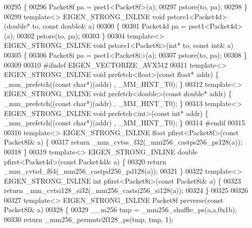 \begin{DoxyCode}
{{00295 \{
00296   Packet8f pa = pset1<Packet8f>(a);
00297   pstore(to, pa);
00298 \}
00299 \textcolor{keyword}{template}<> EIGEN\_STRONG\_INLINE \textcolor{keywordtype}{void} pstore1<Packet4d>(\textcolor{keywordtype}{double}* to, \textcolor{keyword}{const} \textcolor{keywordtype}{double}& a)
00300 \{
00301   Packet4d pa = pset1<Packet4d>(a);
00302   pstore(to, pa);
00303 \}
00304 \textcolor{keyword}{template}<> EIGEN\_STRONG\_INLINE \textcolor{keywordtype}{void} pstore1<Packet8i>(\textcolor{keywordtype}{int}* to, \textcolor{keyword}{const} \textcolor{keywordtype}{int}& a)
00305 \{
00306   Packet8i pa = pset1<Packet8i>(a);
00307   pstore(to, pa);
00308 \}
00309 
00310 \textcolor{preprocessor}{#ifndef EIGEN\_VECTORIZE\_AVX512}
00311 \textcolor{keyword}{template}<> EIGEN\_STRONG\_INLINE \textcolor{keywordtype}{void} prefetch<float>(\textcolor{keyword}{const} \textcolor{keywordtype}{float}*   addr) \{ \_mm\_prefetch((\textcolor{keyword}{const} \textcolor{keywordtype}{char}*)(addr)
      , \_MM\_HINT\_T0); \}
00312 \textcolor{keyword}{template}<> EIGEN\_STRONG\_INLINE \textcolor{keywordtype}{void} prefetch<double>(\textcolor{keyword}{const} \textcolor{keywordtype}{double}* addr) \{ \_mm\_prefetch((\textcolor{keyword}{const} \textcolor{keywordtype}{char}*)(addr)
      , \_MM\_HINT\_T0); \}
00313 \textcolor{keyword}{template}<> EIGEN\_STRONG\_INLINE \textcolor{keywordtype}{void} prefetch<int>(\textcolor{keyword}{const} \textcolor{keywordtype}{int}*       addr) \{ \_mm\_prefetch((\textcolor{keyword}{const} \textcolor{keywordtype}{char}*)(addr)
      , \_MM\_HINT\_T0); \}
00314 \textcolor{preprocessor}{#endif}
00315 
00316 \textcolor{keyword}{template}<> EIGEN\_STRONG\_INLINE \textcolor{keywordtype}{float}  pfirst<Packet8f>(\textcolor{keyword}{const} Packet8f& a) \{
00317   \textcolor{keywordflow}{return} \_mm\_cvtss\_f32(\_mm256\_castps256\_ps128(a));
00318 \}
00319 \textcolor{keyword}{template}<> EIGEN\_STRONG\_INLINE \textcolor{keywordtype}{double} pfirst<Packet4d>(\textcolor{keyword}{const} Packet4d& a) \{
00320   \textcolor{keywordflow}{return} \_mm\_cvtsd\_f64(\_mm256\_castpd256\_pd128(a));
00321 \}
00322 \textcolor{keyword}{template}<> EIGEN\_STRONG\_INLINE \textcolor{keywordtype}{int}    pfirst<Packet8i>(\textcolor{keyword}{const} Packet8i& a) \{
00323   \textcolor{keywordflow}{return} \_mm\_cvtsi128\_si32(\_mm256\_castsi256\_si128(a));
00324 \}
00325 
00326 
00327 \textcolor{keyword}{template}<> EIGEN\_STRONG\_INLINE Packet8f preverse(\textcolor{keyword}{const} Packet8f& a)
00328 \{
00329   \_\_m256 tmp = \_mm256\_shuffle\_ps(a,a,0x1b);
00330   \textcolor{keywordflow}{return} \_mm256\_permute2f128\_ps(tmp, tmp, 1);
}}
\end{DoxyCode}
